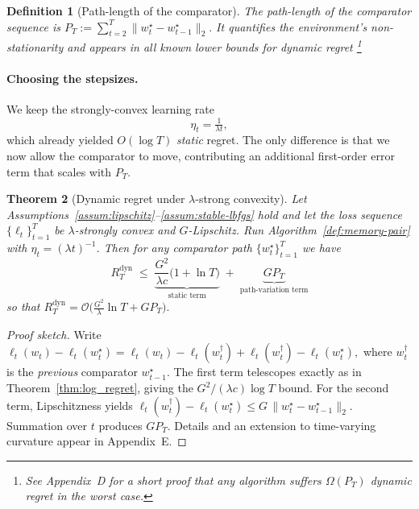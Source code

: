 \documentclass[a4paper,12pt]{article}
\newtheorem{theorem}{Theorem}[section]
\newtheorem{definition}[theorem]{Definition}
\begin{document}
\begin{definition}[Path-length of the comparator]
\label{def:path_length}
The \emph{path-length} of the comparator sequence is
$
  P_T
  :=\sum_{t=2}^{T}\lVert w_t^{\star}-w_{t-1}^{\star}\rVert_2.
$
It quantifies the environment’s non-stationarity
and appears in all known lower bounds for dynamic regret
\footnote{See Appendix~D for a short proof that any algorithm suffers
$\Omega(P_T)$ dynamic regret in the worst case.}
\end{definition}

\paragraph{Choosing the stepsizes.}
We keep the strongly-convex learning rate
$$
  \eta_t = \tfrac{1}{\lambda t},
$$
which already yielded \(O(\log T)\) \emph{static} regret.
The only difference is that we now allow the comparator to move,
contributing an additional first-order error term that scales with \(P_T\).

\begin{theorem}[Dynamic regret under $\lambda$-strong convexity]
\label{thm:dyn_regret}
Let Assumptions~\ref{assum:lipschitz}–\ref{assum:stable-lbfgs} hold
and let the loss sequence
$\{\ell_t\}_{t=1}^{T}$ be $\lambda$-strongly convex and $G$-Lipschitz.
Run Algorithm~\ref{def:memory-pair} with
$\eta_{t} = (\lambda t)^{-1}$.
Then for \emph{any} comparator path $\{w_{t}^{\star}\}_{t=1}^{T}$ we have
\[
  R_{T}^{\mathrm{dyn}}
  \;\le\;
  \underbrace{\frac{G^{2}}{\lambda c}\bigl(1+\ln T\bigr)}_{\text{static term}}
  \;+\;
  \underbrace{G P_{T}}_{\text{path-variation term}}
\]
so that
\(
  R_T^{\mathrm{dyn}}
  =
  \mathcal{O}\!\bigl(\tfrac{G^{2}}{\lambda}\ln T + G P_T\bigr).
\)
\end{theorem}

\begin{proof}[Proof sketch]
Write
\(
  \ell_t(w_t)-\ell_t(w_t^{\star})
  =
  \ell_t(w_t)-\ell_t(w_{t}^{\dagger})
  +\ell_t(w_{t}^{\dagger})-\ell_t(w_t^{\star}),
\)
where $w_t^{\dagger}$ is the \emph{previous} comparator $w_{t-1}^{\star}$.
The first term telescopes exactly as in
Theorem~\ref{thm:log_regret}, giving the \(G^{2}/(\lambda c)\log T\) bound.
For the second term, Lipschitzness yields
\(
  \ell_t(w_{t}^{\dagger})-\ell_t(w_t^{\star})
  \le G\,\lVert w_t^{\star}-w_{t-1}^{\star}\rVert_2.
\)
Summation over \(t\) produces \(G P_T\).
Details and an extension to time-varying curvature appear in Appendix~E.
\end{proof}
\end{document}
